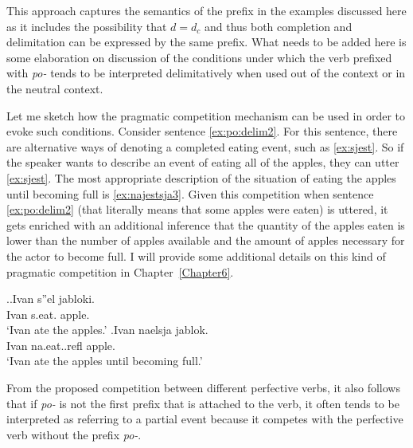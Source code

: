 This approach captures the semantics of the prefix in the examples discussed here as it includes the possibility that $d = d_c$ and thus both completion and delimitation can be expressed by the same prefix. What needs to be added here is some elaboration on discussion of the conditions under which the verb prefixed with \textit{po-} tends to be interpreted delimitatively when used out of the context or in the neutral context.

Let me sketch how the pragmatic competition mechanism can be used in order to evoke such conditions. Consider sentence \ref{ex:po:delim2}. For this sentence, there are alternative ways of denoting a completed eating event, such as \ref{ex:sjest}. So if the speaker wants to describe an event of eating all of the apples, they can utter \ref{ex:sjest}. The most appropriate description of the situation of eating the apples until becoming full is \ref{ex:najestsja3}. Given this competition when sentence \ref{ex:po:delim2} (that literally means that some apples were eaten) is uttered, it gets enriched with an additional inference that the quantity of the apples eaten is lower than the number of apples available and the amount of apples necessary for the actor to become full. I will provide some additional details on this kind of pragmatic competition in Chapter~\ref{Chapter6}.

\ex.\ag.\label{ex:sjest}Ivan s''el jabloki.\\
Ivan s.eat. apple.\\
\trans `Ivan ate the apples.'
\bg.\label{ex:najestsja3}Ivan naelsja jablok.\\
Ivan na.eat..refl apple.\\
\trans `Ivan ate the apples until becoming full.'

From the proposed competition between different perfective verbs, it also follows that if \textit{po-} is not the first prefix that is attached to the verb, it often tends to be interpreted as referring to a partial event because it competes with the perfective verb without the prefix \textit{po-}.


